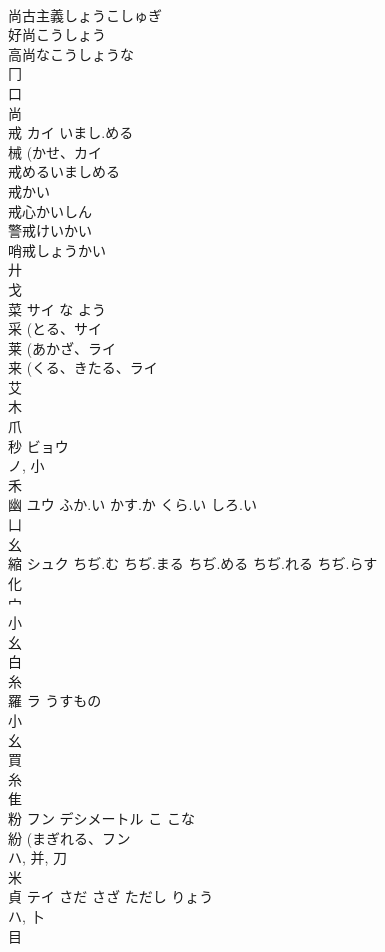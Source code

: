 \documentclass[8pt]{extreport}
\begin{document}
\begin{CJK}{UTF8}{min}
\\	尚古主義しょうこしゅぎ 
\\	好尚こうしょう 
\\	高尚なこうしょうな 
\\	冂 
\\	口 
\\	尚 
\\	戒	カイ	いまし.める	
\\	械 (かせ、カイ 
\\	戒めるいましめる
\\	戒かい
\\	戒心かいしん
\\	警戒けいかい
\\	哨戒しょうかい
\\	廾 
\\	戈 
\\	菜	サイ	な よう	
\\	采 (とる、サイ 
\\	莱 (あかざ、ライ 
\\	来 (くる、きたる、ライ 
\\	艾 
\\	木 
\\	爪 
\\	秒	ビョウ		
\\	ノ, 小 
\\	禾 
\\	幽	ユウ	ふか.い かす.か くら.い しろ.い	
\\	凵 
\\	幺 
\\	縮	シュク	ちぢ.む ちぢ.まる ちぢ.める ちぢ.れる ちぢ.らす	
\\	化 
\\	宀 
\\	小 
\\	幺 
\\	白 
\\	糸 
\\	羅	ラ	うすもの	
\\	小 
\\	幺 
\\	買 
\\	糸 
\\	隹 
\\	粉	フン デシメートル	こ こな	
\\	紛 (まぎれる、フン 
\\	ハ, 并, 刀 
\\	米 
\\	貞	テイ	さだ さざ ただし りょう	
\\	ハ, 卜 
\\	目 

\end{CJK}
\end{document}
